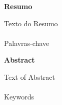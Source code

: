 \newpage
\pagestyle{empty}
\begin{center}
    {\bf \Large Resumo}
\end{center}

\noindent
Texto do Resumo
\\
\\
 Palavras-chave

\newpage
\pagestyle{empty}
\begin{center}
    {\bf \Large Abstract}
\end{center}

\noindent
Text of Abstract
\\
\\
 Keywords

\newpage
\setcounter{page}{1} %
\pagestyle{plain} %
